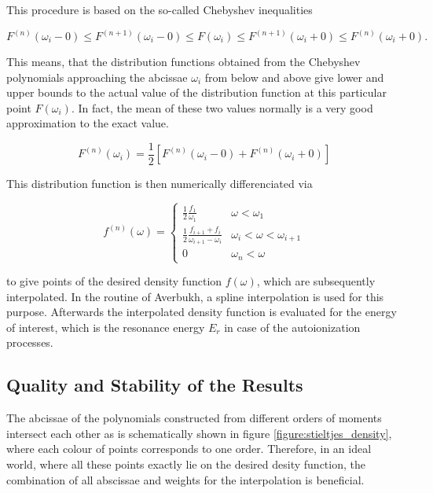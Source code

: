 This procedure is based on the so-called Chebyshev inequalities

\begin{equation} \label{equation:Chebyshev_inequalities}
  F^{(n)}(\omega_i - 0) \le F^{(n+1)}(\omega_i - 0) \le F(\omega_i)
  \le F^{(n+1)}(\omega_i + 0) \le F^{(n)}(\omega_i + 0).
\end{equation}

This means, that the distribution functions obtained from the Chebyshev
polynomials approaching the abcissae $\omega_i$ from below and above
give lower and upper bounds to the actual value of the distribution
function at this particular point $F(\omega_i)$. In fact, the mean of these
two values normally is a very good approximation to the exact value.

\begin{equation}
  F^{(n)} (\omega_i) = \frac 12 \left[ F^{(n)} (\omega_i - 0)
                       + F^{(n)} (\omega_i+0) \right]
\end{equation}

This distribution function is then numerically differenciated via

\begin{equation}
  f^{(n)} (\omega) =
  \begin{cases}
    \frac 12 \frac{f_1}{\omega_1}    & \omega < \omega_1\\
    \frac 12 \frac{f_{i+1} + f_i}{\omega_{i+1} - \omega_i}
                                     & \omega_i < \omega < \omega_{i+1}\\
    0                                & \omega_n < \omega
  \end{cases}
\end{equation}

to give points of the desired density function $f(\omega)$, which are
subsequently interpolated. In the routine of Averbukh, a spline interpolation
is used for this purpose. Afterwards the interpolated density function is evaluated
for the energy of interest, which is the resonance energy $E_r$ in case of the
autoionization processes.

\subsection{Quality and Stability of the Results}
The abcissae of the polynomials constructed from different orders
of moments intersect each other as is schematically shown in
figure \ref{figure:stieltjes_density}, where each colour of points corresponds
to one order. Therefore, in an ideal world, where all these points exactly lie
on the desired desity function, the combination of all abscissae
and weights for the interpolation is beneficial.

